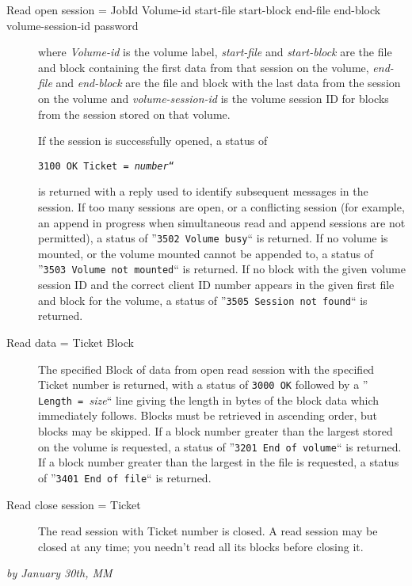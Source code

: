 \begin{description}

\item [Read open session = \lt{}JobId\gt{} \lt{}Volume-id\gt{}
   \lt{}start-file\gt{} \lt{}start-block\gt{}  \lt{}end-file\gt{}
   \lt{}end-block\gt{} \lt{}volume-session-id\gt{} \lt{}password\gt{}  ]
where {\it Volume-id} is the volume label,  {\it start-file} and {\it
start-block} are the file and block containing the  first data from that
session on the volume, {\it end-file} and  {\it end-block} are the file and
block with the last data from the session on  the volume and {\it
volume-session-id} is the volume session ID for blocks from the  session
stored on that volume.  

If the session is successfully opened, a status of  

{\tt {\tt 3100\ OK Ticket\ =\ }{\it number}``}  

is returned with a reply used to identify  subsequent messages in the session.
If too many sessions are open, or a  conflicting session (for example, an
append in progress when simultaneous read  and append sessions are not
permitted), a status of  ''{\tt 3502\ Volume\ busy}`` is returned. If no
volume is mounted, or  the volume mounted cannot be appended to, a status of 
''{\tt 3503\ Volume\ not\ mounted}`` is returned. If no block with  the given
volume session ID and the correct client ID number appears in the  given first
file and block for the volume, a status of  ''{\tt 3505\ Session\ not\
found}`` is returned.  

\item [Read data = \lt{}Ticket\gt{} \gt{} \lt{}Block\gt{}  ]
   The specified Block of data from open read session with the specified Ticket
number  is returned, with a status of {\tt 3000\ OK} followed  by a ''{\tt
Length\ =\ }{\it size}`` line giving the length in  bytes of the block data
which immediately follows. Blocks must be retrieved in  ascending order, but
blocks may be skipped. If a block number greater than the  largest stored on
the volume is requested, a status of  ''{\tt 3201\ End\ of\ volume}`` is
returned. If a block number  greater than the largest in the file is
requested, a status of  ''{\tt 3401\ End\ of\ file}`` is returned.  

\item [Read close session = \lt{}Ticket\gt{}  ]
   The read session with Ticket number is closed. A read session  may be closed
at any time; you needn't read all its blocks before closing it.  
\end{description}

{\it by 
January 30th, MM } 
